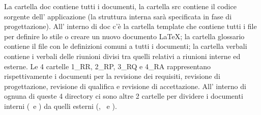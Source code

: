 \documentclass[12pt,a4paper]{article}
\begin{document}
La cartella doc contiene tutti i documenti, la cartella src contiene il codice sorgente dell' applicazione (la struttura interna sarà specificata in fase di progettazione). All' interno di doc c'è la cartella template che contiene tutti i file per definire lo stile o creare un nuovo documento \LaTeX{}; la cartella glossario contiene il file con le definizioni comuni a tutti i documenti; la cartella verbali contiene i verbali delle riunioni divisi tra quelli relativi a riunioni interne ed esterne. Le 4 cartelle 1\_RR, 2\_RP, 3\_RQ e 4\_RA rappresentano rispettivamente i documenti per la revisione dei requisiti, revisione di progettazione, revisione di qualifica e revisione di accettazione. All' interno di ognuna di queste 4 directory ci sono altre 2 cartelle per dividere i documenti interni (\NdP\ e \SdF) da quelli esterni (\AdR, \PdP\ e \PdQ).

\newpage
\printglossary[title={Glossario}]
\end{document}
